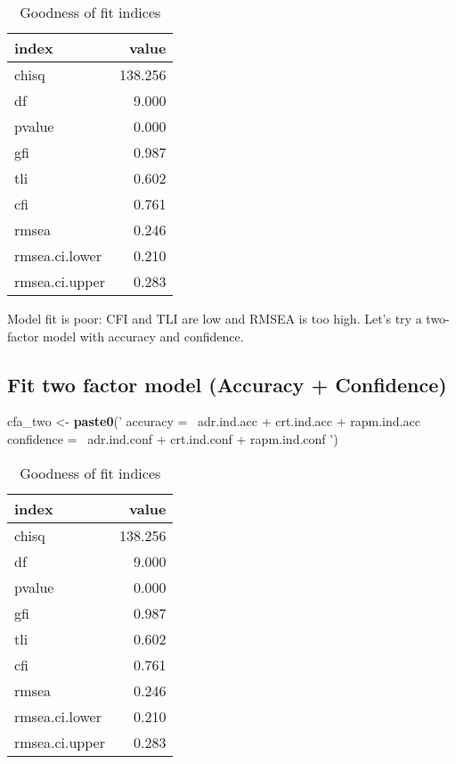 \documentclass[
]{article}
\newenvironment{Shaded}{\begin{snugshade}}{\end{snugshade}}
\newcommand{\KeywordTok}[1]{\textcolor[rgb]{0.13,0.29,0.53}{\textbf{#1}}}
\newcommand{\NormalTok}[1]{#1}
\newcommand{\StringTok}[1]{\textcolor[rgb]{0.31,0.60,0.02}{#1}}
\begin{document}
\begin{table}[H]

\caption{\label{tab:unnamed-chunk-2}Goodness of fit indices}
\centering
\fontsize{12}{14}\selectfont
\begin{tabular}[t]{lr}
\toprule
index & value\\
\midrule
chisq & 138.256\\
df & 9.000\\
pvalue & 0.000\\
gfi & 0.987\\
tli & 0.602\\
\addlinespace
cfi & 0.761\\
rmsea & 0.246\\
rmsea.ci.lower & 0.210\\
rmsea.ci.upper & 0.283\\
\bottomrule
\end{tabular}
\end{table}

Model fit is poor: CFI and TLI are low and RMSEA is too high. Let's try
a two-factor model with accuracy and confidence.

\hypertarget{fit-two-factor-model-accuracy-confidence}{%
\subsection{Fit two factor model (Accuracy +
Confidence)}\label{fit-two-factor-model-accuracy-confidence}}

\begin{Shaded}
\begin{Highlighting}[]
\NormalTok{cfa_two <-}\StringTok{ }\KeywordTok{paste0}\NormalTok{(}\StringTok{'}
\StringTok{                accuracy  =~ adr.ind.acc + crt.ind.acc + rapm.ind.acc }
\StringTok{                }
\StringTok{                confidence =~ adr.ind.conf + crt.ind.conf + rapm.ind.conf}
\StringTok{                     '}\NormalTok{)}
\end{Highlighting}
\end{Shaded}

\begin{table}[H]

\caption{\label{tab:unnamed-chunk-4}Goodness of fit indices}
\centering
\fontsize{12}{14}\selectfont
\begin{tabular}[t]{lr}
\toprule
index & value\\
\midrule
chisq & 138.256\\
df & 9.000\\
pvalue & 0.000\\
gfi & 0.987\\
tli & 0.602\\
\addlinespace
cfi & 0.761\\
rmsea & 0.246\\
rmsea.ci.lower & 0.210\\
rmsea.ci.upper & 0.283\\
\bottomrule
\end{tabular}
\end{table}
\end{document}
